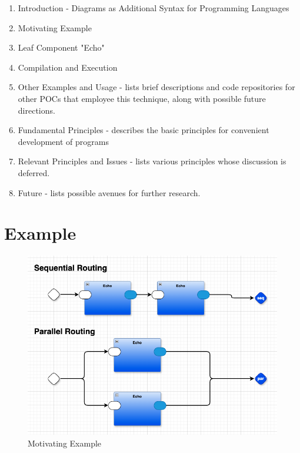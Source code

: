 \documentclass[10pt,anonymous,review]{acmart}
\begin{document}
\begin{enumerate}
\item Introduction - Diagrams as Additional Syntax for Programming
Languages

\item Motivating Example

\item Leaf Component "Echo"

\item Compilation and Execution

\item Other Examples and Usage - lists brief descriptions and
code repositories for other POCs that employee this technique, along
with possible future directions.

\item Fundamental Principles - describes the basic principles
for convenient development of programs

\item Relevant Principles and Issues - lists various
principles whose discussion is deferred.

\item Future - lists possible avenues for further research.

\end{enumerate}

\section{Example}

  \begin{figure}[h]
    \centering
    \includegraphics[width=0.8\linewidth]{./media/HelloWorld0D.png}
    \caption{Motivating Example}
    \label{mot}
  \end{figure}
\end{document}
